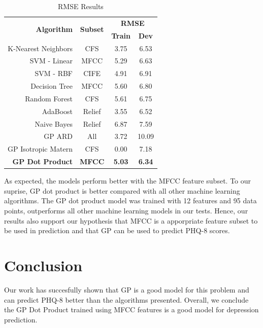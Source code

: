 \documentclass{article}
\begin{document}
	\begin{table}[h!]
		\begin{center}
			\begin{tabular}{ | r | c | c | c | }
			\hline
			\multirow{2}{*}{\bfseries Algorithm}	& \multirow{2}{*}{\bfseries Subset}	& \multicolumn{2}{c|}{\bfseries RMSE} \\\cline{3-4}
									&						& \bfseries Train 	& \bfseries Dev \\ \hline
			K-Nearest Neighbors   			& CFS 					& 3.75 		& 6.53 \\ \hline
			SVM - Linear          				& MFCC  					& 5.29 		& 6.63 \\ \hline
			SVM - RBF             				& CIFE  					& 4.91 		& 6.91 \\ \hline
			Decision Tree         				& MFCC  					& 5.60 		& 6.80 \\ \hline
			Random Forest         			& CFS   					& 5.61 		& 6.75 \\ \hline
			AdaBoost              				& Relief					& 3.55 		& 6.52 \\ \hline
			Naive Bayes           				& Relief					& 6.87 		& 7.59 \\ \hline
			GP ARD                				& All   						& 3.72 		& 10.09 \\ \hline
			GP Isotropic Matern   			& CFS   					& 0.00 		& 7.18 \\ \hline 
			\bfseries GP Dot Product  	& \bfseries MFCC  & \bfseries 5.03 & \bfseries 6.34 \\ \hline
			\end{tabular}
		\end{center}
		\caption{RMSE Results}
		\label{rmse_results}
	\end{table}
	
	As expected, the models perform better with the MFCC feature subset. 
	To our suprise, GP dot product is better compared with all other machine learning algorithms. 
	The GP dot product model was trained with 12 features and 95 data points, outperforms all other machine learning models in our tests. 
	Hence, our results also support our hypothesis that MFCC is a apporpriate feature subset to be used in prediction and that GP can be used to predict PHQ-8 scores.

	\section{Conclusion}	
	Our work has succesfully shown that GP is a good model for this problem and can predict PHQ-8 better than the algorithms presented.
	Overall, we conclude the GP Dot Product trained using MFCC features is a good model for depression prediction.
	
\end{document}
